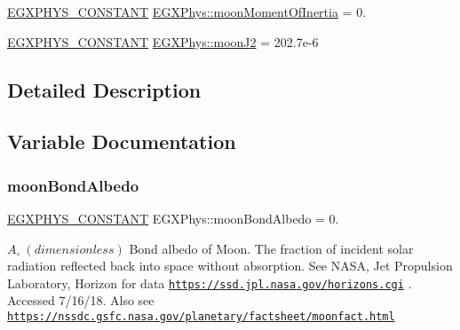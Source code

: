 \begin{DoxyCompactItemize}
\mbox{\hyperlink{group___e_g_x_phys-_constants-_macros_ga76980d288494ce1714c9ac68a95ba702}{E\+G\+X\+P\+H\+Y\+S\+\_\+\+C\+O\+N\+S\+T\+A\+NT}} \mbox{\hyperlink{group___e_g_x_phys-_constants-_astrophysics-_solar_system-_moon-_bulk_gabc75a86c039f1b5b3925c982e2b66439}{E\+G\+X\+Phys\+::moon\+Moment\+Of\+Inertia}} = 0.
\item 
\mbox{\hyperlink{group___e_g_x_phys-_constants-_macros_ga76980d288494ce1714c9ac68a95ba702}{E\+G\+X\+P\+H\+Y\+S\+\_\+\+C\+O\+N\+S\+T\+A\+NT}} \mbox{\hyperlink{group___e_g_x_phys-_constants-_astrophysics-_solar_system-_moon-_bulk_gabc4f68e3f15df659732dace60ffa5948}{E\+G\+X\+Phys\+::moon\+J2}} = 202.\+7e-\/6
\end{DoxyCompactItemize}


\subsection{Detailed Description}


\subsection{Variable Documentation}
\mbox{\label{group___e_g_x_phys-_constants-_astrophysics-_solar_system-_moon-_bulk_ga617e90787809967490132ad3d9345512}} 
\subsubsection{\texorpdfstring{moon\+Bond\+Albedo}{moonBondAlbedo}}
{\footnotesize\ttfamily \mbox{\hyperlink{group___e_g_x_phys-_constants-_macros_ga76980d288494ce1714c9ac68a95ba702}{E\+G\+X\+P\+H\+Y\+S\+\_\+\+C\+O\+N\+S\+T\+A\+NT}} E\+G\+X\+Phys\+::moon\+Bond\+Albedo = 0.}

$ A_{\circ} \ (dimensionless)$ Bond albedo of Moon. The fraction of incident solar radiation reflected back into space without absorption. See N\+A\+SA, Jet Propulsion Laboratory, Horizon for data \href{https://ssd.jpl.nasa.gov/horizons.cgi}{\tt https\+://ssd.\+jpl.\+nasa.\+gov/horizons.\+cgi} . Accessed 7/16/18. Also see \href{https://nssdc.gsfc.nasa.gov/planetary/factsheet/moonfact.html}{\tt https\+://nssdc.\+gsfc.\+nasa.\+gov/planetary/factsheet/moonfact.\+html} \mbox{\label{group___e_g_x_phys-_constants-_astrophysics-_solar_system-_moon-_bulk_ga737875bb775588bea086e174ae8082e0}} 
